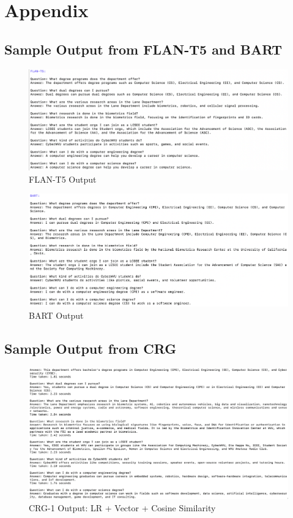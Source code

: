 \documentclass[conference]{IEEEtran}
\begin{document}
\newpage
\onecolumn
\appendix
\section{Appendix}
\subsection{Sample Output from FLAN-T5 and BART} \label{app:directllm_output}
\begin{figure}[!h]
    \centering
    \includegraphics[width=\linewidth]{assets/Flan_out.png}
    \caption{FLAN-T5 Output}
    \label{fig:FLAN_Out}
\end{figure}

\begin{figure}[!h]
    \centering
    \includegraphics[width=\linewidth]{assets/Bart_out.png}
    \caption{BART Output}
    \label{fig:BART_Out}
\end{figure}

\newpage
\subsection{Sample Output from CRG} \label{app:crg_output}
\begin{figure}[!h]
    \centering
    \includegraphics[width=\linewidth]{assets/CRG1_out.png}
    \caption{CRG-1 Output: LR + Vector + Cosine Similarity}
    \label{fig:CRG_1-Out}
\end{figure}
\end{document}
